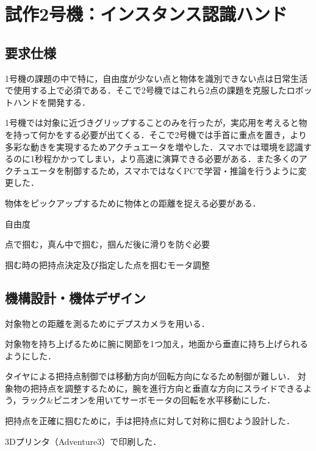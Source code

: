 \chapter{試作2号機：インスタンス認識ハンド}
\newpage

\section{要求仕様}
1号機の課題の中で特に，自由度が少ない点と物体を識別できない点は日常生活で使用する上で必須である．そこで2号機ではこれら2点の課題を克服したロボットハンドを開発する．

1号機では対象に近づきグリップすることのみを行ったが，実応用を考えると物を持って何かをする必要が出てくる．そこで2号機では手首に重点を置き，より多彩な動きを実現するためアクチュエータを増やした．スマホでは環境を認識するのに1秒程かかってしまい，より高速に演算できる必要がある．また多くのアクチュエータを制御するため，スマホではなくPCで学習・推論を行うように変更した．

物体をピックアップするために物体との距離を捉える必要がある．

自由度

点で掴む，真ん中で掴む，掴んだ後に滑りを防ぐ必要

掴む時の把持点決定及び指定した点を掴むモータ調整


\section{機構設計・機体デザイン}

対象物との距離を測るためにデプスカメラを用いる．


対象物を持ち上げるために腕に関節を1つ加え，地面から垂直に持ち上げられるようにした．

タイヤによる把持点制御では移動方向が回転方向になるため制御が難しい．
対象物の把持点を調整するために，腕を進行方向と垂直な方向にスライドできるよう，ラック\&ピニオンを用いてサーボモータの回転を水平移動にした．

把持点を正確に掴むために，手は把持点に対して対称に掴むよう設計した．

3Dプリンタ（Adventure3）で印刷した．

